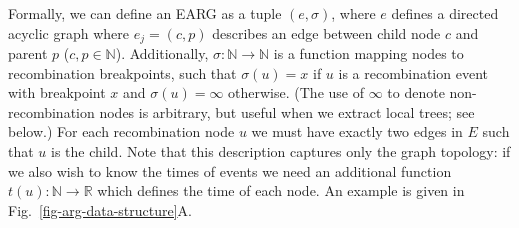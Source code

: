 \documentclass{article}
\begin{document}
Formally, we can define an EARG as a tuple $(e, \sigma)$, where $e$
defines a directed acyclic graph where $e_j = (c, p)$ describes
an edge between
child node $c$ and parent $p$ ($c, p \in \mathbb{N}$).
Additionally,
$\sigma: \mathbb{N} \rightarrow \mathbb{N}$
is a function mapping nodes to recombination breakpoints, such that $\sigma(u) = x$
if $u$ is a recombination event with breakpoint $x$ and
$\sigma(u) = \infty$ otherwise. (The use of $\infty$ to denote
non-recombination nodes is arbitrary, but useful when we extract
local trees; see below.)
For each recombination node $u$ we must
have exactly two edges in $E$ such that $u$ is the child.
Note that this description captures only the
graph topology: if we also wish to know the times of events we need
an additional function $t(u): \mathbb{N} \rightarrow \mathbb{R}$
which defines the time of each node.
An example is given in Fig.~\ref{fig-arg-data-structure}A.
\end{document}

